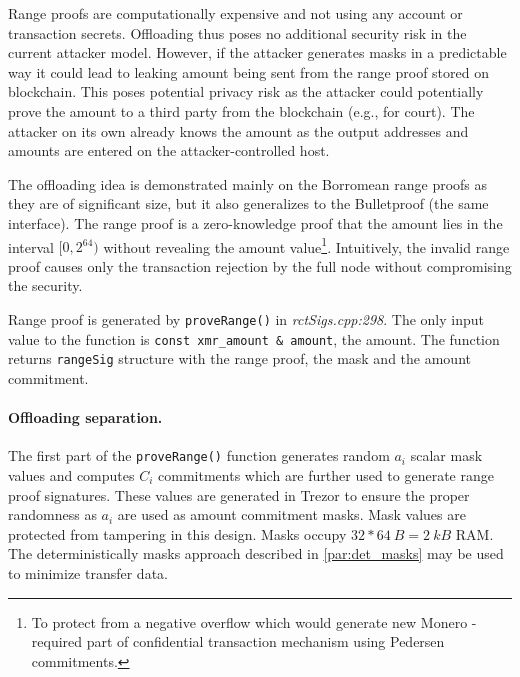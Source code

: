 \documentclass[]{article}
\begin{document}
Range proofs are computationally expensive and not using any account or transaction secrets. Offloading thus poses no additional security risk in the current attacker model. However, if the attacker generates masks in a predictable way it could lead to leaking amount being sent from the range proof stored on blockchain. This poses potential privacy risk as the attacker could potentially prove the amount to a third party from the blockchain (e.g., for court). The attacker on its own already knows the amount as the output addresses and amounts are entered on the attacker-controlled host.

The offloading idea is demonstrated mainly on the Borromean range proofs as they are of significant size, but it also generalizes to the Bulletproof (the same interface). 
The range proof is a zero-knowledge proof that the amount lies in the interval $[0, 2^{64})$ without revealing the amount value\footnote{To protect from a negative overflow which would generate new Monero - required part of confidential transaction mechanism using Pedersen commitments.}. Intuitively, the invalid range proof causes only the transaction rejection by the full node without compromising the security.

Range proof is generated by \verb|proveRange()| in \emph{rctSigs.cpp:298}. The only input value to the function is \verb|const xmr_amount & amount|, the amount. The function returns \verb|rangeSig| structure with the range proof, the mask and the amount commitment. 

\paragraph{Offloading separation.}
The first part of the \verb|proveRange()| function generates random $a_i$ scalar mask values and computes $C_i$ commitments which are further used to generate range proof signatures. These values are generated in Trezor to ensure the proper randomness as $a_i$ are used as amount commitment masks. Mask values are protected from tampering in this design. Masks occupy $32*64~B = 2~kB$ RAM. 
The deterministically masks approach described in \ref{par:det_masks} may be used to minimize transfer data.

\end{document}
